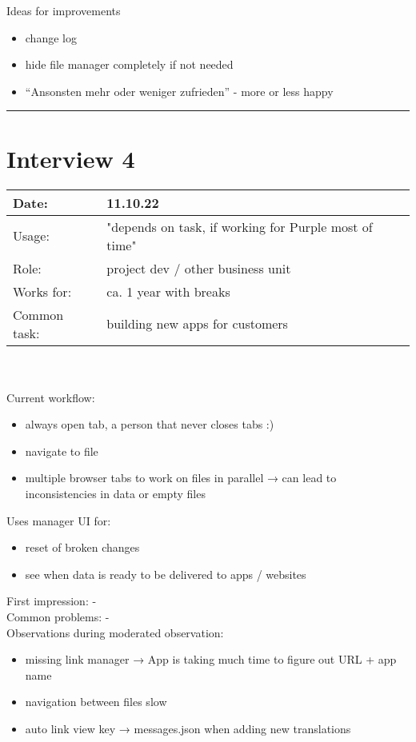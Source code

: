 Ideas for improvements
\begin{itemize}[nosep]  
  \item change log
  \item hide file manager completely if not needed
  \item “Ansonsten mehr oder weniger zufrieden” - more or less happy
\end{itemize}
\bigskip
\hrule
\newpage
\section{Interview 4}
\begin{tabularx}{\linewidth}{lX}
  Date: & 11.10.22 \\
  \hline
  Usage: & "depends on task, if working for Purple most of time"\\
  \hline
  Role: & project dev / other business unit \\
  \hline
  Works for: & ca. 1 year with breaks \\
  \hline
  Common task: &  building new apps for customers
\end{tabularx}
\\\\
Current workflow:
\begin{itemize}[nosep]
  \item always open tab, a person that never closes tabs :)
  \item navigate to file
  \item multiple browser tabs to work on files in parallel → can lead to inconsistencies in data or empty files
\end{itemize}
Uses manager UI for:
\begin{itemize}[nosep]
  \item reset of broken changes
  \item see when data is ready to be delivered to apps / websites
\end{itemize}

First impression: -\\
Common problems: -\\
Observations during moderated observation:
\begin{itemize}[nosep]
  \item missing link manager → App is taking much time to figure out URL + app name
  \item navigation between files slow
  \item auto link view key → messages.json when adding new translations
\end{itemize}
